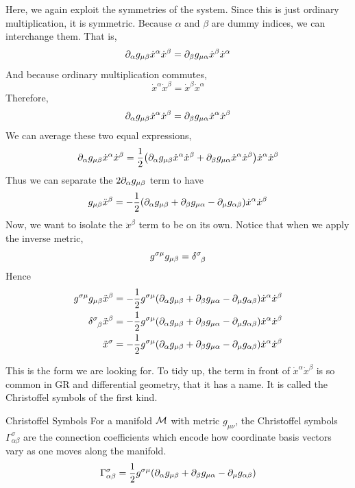 	Here, we again exploit the symmetries of the system. Since
	this is just ordinary multiplication, it is symmetric.
	Because $\alpha$ and $\beta$ are dummy indices, we can interchange them.
	That is,
	\[
		\partial_\alpha
		g_{\mu\beta} 
		\dot{x}^\alpha 
		\dot{x}^\beta 
		=
		\partial_\beta
		g_{\mu\alpha}
		\dot{x}^\beta 
		\dot{x}^\alpha 
	\]
	And because ordinary multiplication commutes,
	\[
		\dot{x}^\alpha 
		\dot{x}^\beta 
		=
		\dot{x}^\beta 
		\dot{x}^\alpha 
	\]
	Therefore,
	\[
		\partial_\alpha
		g_{\mu\beta} 
		\dot{x}^\alpha 
		\dot{x}^\beta 
		=
		\partial_\beta
		g_{\mu\alpha}
		\dot{x}^\alpha 
		\dot{x}^\beta 
	\]
	We can average these two equal expressions,
	\[
		\p_\alpha
		g_{\mu\beta} 
		\dot{x}^\alpha 
		\dot{x}^\beta 
		=
		\frac{1}{2}
		\pqty{
			\p_\alpha
			g_{\mu\beta} 
			\dot{x}^\alpha 
			\dot{x}^\beta 
			+
			\p_\beta
			g_{\mu\alpha}
			\dot{x}^\alpha 
			\dot{x}^\beta 
		}
		\dot{x}^\alpha 
		\dot{x}^\beta 
	\]
	Thus we can separate the $2 \partial_\alpha{g_{\mu\beta}}$ term to have
	\[
		g_{\mu\beta}\ddot{x}^\beta
		=
		-
		\frac{1}{2} 
		\pqty{
			\p_\alpha{g_{\mu\beta}}
			+
			\p_\beta{g_{\mu\alpha}}
			-
			\p_\mu g_{\alpha\beta}
		}
		\dot{x}^\alpha 
		\dot{x}^\beta 
	\]
	Now, we want to isolate the $\ddot{x}^\beta$ term to be on its own.
	Notice that when we apply the inverse metric,
	\[
		g^{\sigma\mu}
		g_{\mu\beta}
		=
		\delta\indices{^\sigma_\beta}
	\]
	Hence
	\begin{align*}
		g^{\sigma\mu}
		g_{\mu\beta}
		\ddot{x}^\beta
		&=
		-
		\frac{1}{2} 
		g^{\sigma\mu}
		\pqty{
			\p_\alpha{g_{\mu\beta}}
			+
			\p_\beta{g_{\mu\alpha}}
			-
			\p_\mu g_{\alpha\beta}
		}
		\dot{x}^\alpha 
		\dot{x}^\beta \\
		\delta\indices{^\sigma_\beta}
		\ddot{x}^\beta
		&=
		-
		\frac{1}{2} 
		g^{\sigma\mu}
		\pqty{
			\p_\alpha{g_{\mu\beta}}
			+
			\p_\beta{g_{\mu\alpha}}
			-
			\p_\mu g_{\alpha\beta}
		}
		\dot{x}^\alpha 
		\dot{x}^\beta \\
		\ddot{x}^\sigma
		&=
		-
		\frac{1}{2} 
		g^{\sigma\mu}
		\pqty{
			\p_\alpha{g_{\mu\beta}}
			+
			\p_\beta{g_{\mu\alpha}}
			-
			\p_\mu g_{\alpha\beta}
		}
		\dot{x}^\alpha 
		\dot{x}^\beta 
	\end{align*}

	This is the form we are looking for. To tidy up, the term in front of 
	$
		\dot{x}^\alpha 
		\dot{x}^\beta 
	$ is so
	common in GR and differential geometry, that it has a name. It is called the Christoffel symbols of the first kind.
	\begin{definition}{Christoffel Symbols}
		For a manifold $\mathcal M$ with metric $g_{\mu\nu}$,
		the Christoffel symbols $\Gamma^\sigma_{\alpha\beta}$ are 
		the connection coefficients which encode how coordinate 
		basis vectors vary as one moves along the manifold.
		\begin{equation}
			\label{eq:christoffel-symbol}
			\Gamma^{\sigma}_{\alpha\beta}
			= 
			\frac{1}{2} 
			g^{\sigma\mu}
			\pqty{
				\p_\alpha{g_{\mu\beta}}
				+
				\p_\beta{g_{\mu\alpha}}
				-
				\p_\mu g_{\alpha\beta}
			}
		\end{equation}
	\end{definition}
	
